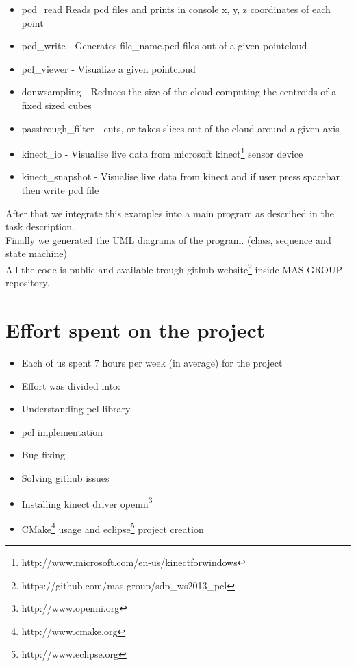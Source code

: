 \documentclass[paper=a4, fontsize=12pt]{scrartcl} %
\numberwithin{equation}{section} %
\numberwithin{figure}{section} %
\numberwithin{table}{section} %
\begin{document}
\begin{itemize}
  \item pcd\_read  Reads pcd files and prints in console x, y, z coordinates of each point
  \item pcd\_write - Generates file\_name.pcd files out of a given pointcloud
  \item pcl\_viewer - Visualize a given pointcloud
  \item donwsampling - Reduces the size of the cloud computing the centroids of a fixed sized cubes
  \item passtrough\_filter - cuts, or takes slices out of the cloud around a given axis
  \item kinect\_io - Visualise live data from microsoft kinect\footnote{http://www.microsoft.com/en-us/kinectforwindows} sensor device
  \item kinect\_snapshot - Visualise live data from kinect and if user press spacebar then write pcd file
\end{itemize}

After that we integrate this examples into a main program as described in the task description.
\\[10pt]
Finally we generated the UML diagrams of the program. (class, sequence and state machine)
\\[10pt]
All the code is public and available trough github website\footnote{https://github.com/mas-group/sdp\_ws2013\_pcl} inside MAS-GROUP repository.
\\[10pt]





\section{Effort spent on the project}


\begin{itemize}
  \item Each of us spent 7 hours per week (in average) for the project
  \item Effort was divided into: 
  \item Understanding pcl library
  \item pcl implementation
  \item Bug fixing
  \item Solving github issues
  \item Installing kinect driver openni\footnote{http://www.openni.org}
  \item CMake\footnote{http://www.cmake.org} usage and eclipse\footnote{http://www.eclipse.org} project creation
\end{itemize}
\end{document}
